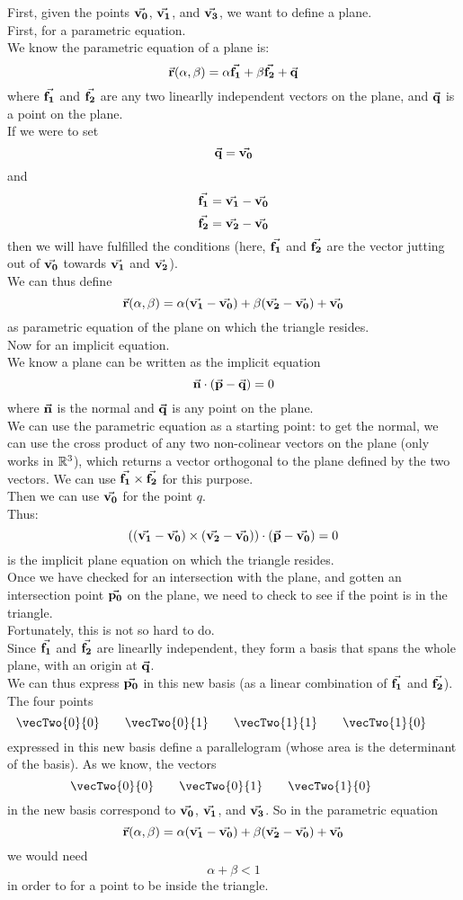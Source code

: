 \documentclass[12pt]{article}
\begin{document}
First, given the points $\vec{\mathbf{v_0}}$, $\vec{\mathbf{v_1}}$,
and $\vec{\mathbf{v_3}}$,
we want to define a plane. \\

First, for a parametric equation. \\
We know the parametric equation of a plane is:
\[ \vec{\mathbf{r}}(\alpha, \beta) 
= \alpha \vec{\mathbf{f_1}} + \beta \vec{\mathbf{f_2}} + \vec{\mathbf{q}} \]
where $\vec{\mathbf{f_1}}$ and $\vec{\mathbf{f_2}}$
are any two linearlly independent vectors
on the plane,
and $\vec{\mathbf{q}}$ is a point on the plane. \\
If we were to set
\[ \vec{\mathbf{q}} = \vec{\mathbf{v_0}} \] 
and 
\[ \vec{\mathbf{f_1}} = \vec{\mathbf{v_1}} - \vec{\mathbf{v_0}}   \]
\[ \vec{\mathbf{f_2}} = \vec{\mathbf{v_2}} - \vec{\mathbf{v_0}}   \]
then we will have fulfilled the conditions
(here, $\vec{\mathbf{f_1}}$ and $\vec{\mathbf{f_2}}$ 
are the vector jutting out of $\vec{\mathbf{v_0}}$
towards $\vec{\mathbf{v_1}}$ and $\vec{\mathbf{v_2}}$). \\
We can thus define
\[ \vec{\mathbf{r}}(\alpha, \beta) 
= \alpha (\vec{\mathbf{v_1}} - \vec{\mathbf{v_0}})
+ \beta (\vec{\mathbf{v_2}} - \vec{\mathbf{v_0}}) + \vec{\mathbf{v_0}} \]
as parametric equation of the plane
on which the triangle resides. \\

Now for an implicit equation. \\
We know a plane can be written as the implicit
equation 
\[ \vec{\mathbf{n}} \cdot (\vec{\mathbf{p}} - \vec{\mathbf{q}}) = 0 \]
where $\vec{\mathbf{n}}$ is the normal
and $\vec{\mathbf{q}}$ is any point on the plane. \\
We can use the parametric equation as a starting
point:
to get the normal, we can use the cross
product of any two non-colinear vectors
on the plane (only works in $\mathbb{R}^3$),
which returns a vector orthogonal to the plane
defined by the two vectors.
We can use $\vec{\mathbf{f_1}} \times \vec{\mathbf{f_2}}$
for this purpose. \\
Then we can use $\vec{\mathbf{v_0}}$ for the point $q$. \\
Thus:
\[ ((\vec{\mathbf{v_1}} - \vec{\mathbf{v_0}}) \times (\vec{\mathbf{v_2}} - \vec{\mathbf{v_0}}))
\cdot (\vec{\mathbf{p}} - \vec{\mathbf{v_0}}) = 0 \]
is the implicit plane equation on which the
triangle resides. \\

Once we have checked for an intersection with the
plane,
and gotten an intersection point $\vec{\mathbf{p_0}}$
on the plane,
we need to check to see if the point is in the
triangle. \\
Fortunately, this is not so hard to do. \\
Since $\vec{\mathbf{f_1}}$ and $\vec{\mathbf{f_2}}$
are linearlly independent,
they form a basis that spans the whole plane,
with an origin at $\vec{\mathbf{q}}$. \\
We can thus express $\vec{\mathbf{p_0}}$ in this
new basis (as a linear combination
of $\vec{\mathbf{f_1}}$ and $\vec{\mathbf{f_2}}$). \\
The four points
\[ \vecTwo{0}{0} \qquad
\vecTwo{0}{1} \qquad
\vecTwo{1}{1} \qquad
\vecTwo{1}{0} \qquad \]
expressed in this new basis
define a parallelogram
(whose area is the determinant of the basis).
As we know, the vectors
\[ \vecTwo{0}{0} \qquad
\vecTwo{0}{1} \qquad
\vecTwo{1}{0} \qquad \]
in the new basis correspond to
$\vec{\mathbf{v_0}}$, $\vec{\mathbf{v_1}}$, and $\vec{\mathbf{v_3}}$.
So in the parametric equation
\[ \vec{\mathbf{r}}(\alpha, \beta) 
= \alpha (\vec{\mathbf{v_1}} - \vec{\mathbf{v_0}})
+ \beta (\vec{\mathbf{v_2}} - \vec{\mathbf{v_0}}) + \vec{\mathbf{v_0}} \]
we would need
\[ \alpha + \beta < 1 \]
in order to for a point to be inside the triangle. \\
\end{document}
